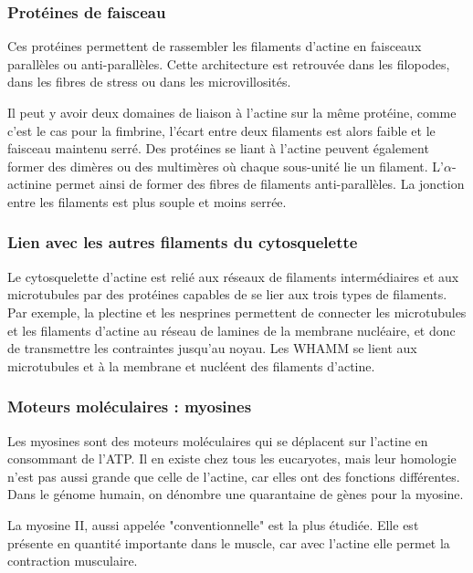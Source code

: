 \subsubsection{Protéines de faisceau}

Ces protéines permettent de rassembler les filaments d'actine en faisceaux parallèles ou anti-parallèles. Cette architecture est retrouvée dans les filopodes, dans les fibres de stress ou dans les microvillosités.

Il peut y avoir deux domaines de liaison à l'actine sur la même protéine, comme c'est le cas pour la fimbrine, l'écart entre deux filaments est alors faible et le faisceau maintenu serré. 
Des protéines se liant à l'actine peuvent également former des dimères ou des multimères où chaque sous-unité lie un filament. L'$\alpha$-actinine permet ainsi de former des fibres de filaments anti-parallèles. La jonction entre les filaments est plus souple et moins serrée. 

\subsubsection{Lien avec les autres filaments du cytosquelette}

Le cytosquelette d'actine est relié aux réseaux de filaments intermédiaires et aux microtubules par des protéines capables de se lier aux trois types de filaments. 
Par exemple, la plectine et les nesprines permettent de connecter les microtubules et les filaments d'actine au réseau de lamines de la membrane nucléaire, et donc de transmettre les contraintes jusqu'au noyau. 
Les WHAMM se lient aux microtubules et à la membrane et nucléent des filaments d'actine. 


 



\subsubsection{Moteurs moléculaires : myosines}

Les myosines sont des moteurs moléculaires qui se déplacent sur l'actine en consommant de l'ATP. Il en existe chez tous les eucaryotes, mais leur homologie n'est pas aussi grande que celle de l'actine, car elles ont des fonctions différentes. Dans le génome humain, on dénombre une quarantaine de gènes pour la myosine. 

La myosine II, aussi appelée "conventionnelle" est la plus étudiée. Elle est présente en quantité importante dans le muscle, car avec l'actine elle permet la contraction musculaire. 


